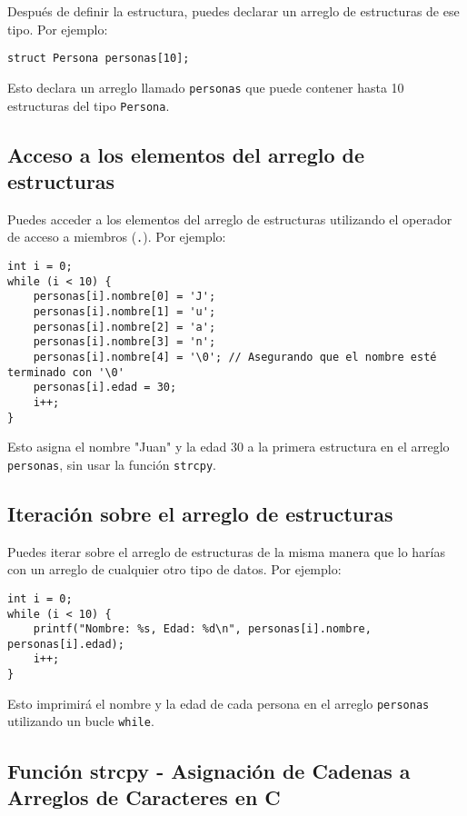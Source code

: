 \documentclass{article}
\begin{document}
Después de definir la estructura, puedes declarar un arreglo de estructuras de ese tipo. Por ejemplo:

\begin{verbatim}
struct Persona personas[10];
\end{verbatim}

Esto declara un arreglo llamado \texttt{personas} que puede contener hasta 10 estructuras del tipo \texttt{Persona}.

\subsection{Acceso a los elementos del arreglo de estructuras}

Puedes acceder a los elementos del arreglo de estructuras utilizando el operador de acceso a miembros (\texttt{.}). Por ejemplo:

\begin{verbatim}
int i = 0;
while (i < 10) {
    personas[i].nombre[0] = 'J';
    personas[i].nombre[1] = 'u';
    personas[i].nombre[2] = 'a';
    personas[i].nombre[3] = 'n';
    personas[i].nombre[4] = '\0'; // Asegurando que el nombre esté terminado con '\0'
    personas[i].edad = 30;
    i++;
}
\end{verbatim}

Esto asigna el nombre "Juan" y la edad 30 a la primera estructura en el arreglo \texttt{personas}, sin usar la función \texttt{strcpy}.

\subsection*{Iteración sobre el arreglo de estructuras}

Puedes iterar sobre el arreglo de estructuras de la misma manera que lo harías con un arreglo de cualquier otro tipo de datos. Por ejemplo:

\begin{verbatim}
int i = 0;
while (i < 10) {
    printf("Nombre: %s, Edad: %d\n", personas[i].nombre, personas[i].edad);
    i++;
}
\end{verbatim}

Esto imprimirá el nombre y la edad de cada persona en el arreglo \texttt{personas} utilizando un bucle \texttt{while}.

\subsection{Función strcpy - Asignación de Cadenas a Arreglos de Caracteres en C}
\end{document}
